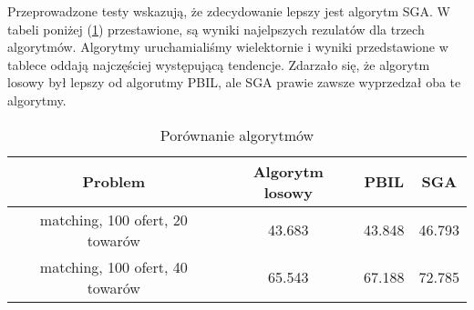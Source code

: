 Przeprowadzone testy wskazują, że zdecydowanie lepszy jest algorytm SGA.
W tabeli poniżej (\ref{tabela:porownanie}) przestawione, są wyniki najelpszych rezulatów dla trzech algorytmów.
Algorytmy uruchamialiśmy wielektornie i wyniki przedstawione w tablece oddają najczęściej występującą tendencje.
Zdarzało się, że algorytm losowy był lepszy od algorutmy PBIL, ale SGA prawie zawsze wyprzedzał oba te algorytmy.

\begin{table}[!ht]
    \centering
    \begin{tabular}{c c c c}
        Problem & Algorytm losowy & PBIL & SGA \\ \hline\hline
        matching, 100 ofert, 20 towarów & 43.683 & 43.848 & 46.793 \\
        matching, 100 ofert, 40 towarów & 65.543 & 67.188 & 72.785 \\
    \end{tabular}
    \caption{Porównanie algorytmów}
    \label{tabela:porownanie}
\end{table}
